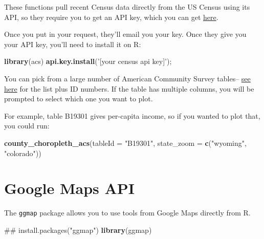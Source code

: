 \documentclass[]{book}
\makeatletter
\newenvironment{Shaded}{\begin{snugshade}}{\end{snugshade}}
\newcommand{\KeywordTok}[1]{\textcolor[rgb]{0.13,0.29,0.53}{\textbf{#1}}}
\newcommand{\DataTypeTok}[1]{\textcolor[rgb]{0.13,0.29,0.53}{#1}}
\newcommand{\StringTok}[1]{\textcolor[rgb]{0.31,0.60,0.02}{#1}}
\newcommand{\NormalTok}[1]{#1}
\newenvironment{kframe}{%
\medskip{}
\setlength{\fboxsep}{.8em}
 \def\at@end@of@kframe{}%
 \ifinner\ifhmode%
  \def\at@end@of@kframe{\end{minipage}}%
  \begin{minipage}{\columnwidth}%
 \fi\fi%
 \def\FrameCommand##1{\hskip\@totalleftmargin \hskip-\fboxsep
 \colorbox{shadecolor}{##1}\hskip-\fboxsep
     \hskip-\linewidth \hskip-\@totalleftmargin \hskip\columnwidth}%
 \MakeFramed {\advance\hsize-\width
   \@totalleftmargin\z@ \linewidth\hsize
   \@setminipage}}%
 {\par\unskip\endMakeFramed%
 \at@end@of@kframe}
\renewenvironment{Shaded}{\begin{kframe}}{\end{kframe}}
\theoremstyle{definition}
\theoremstyle{definition}
\theoremstyle{definition}
\theoremstyle{remark}
\makeatother
\begin{document}
These functions pull recent Census data directly from the US Census
using its API, so they require you to get an API key, which you can get
\href{http://api.census.gov/data/key_signup.html}{here}. \bigskip

Once you put in your request, they'll email you your key. Once they give
you your API key, you'll need to install it on R:

\begin{Shaded}
\begin{Highlighting}[]
\KeywordTok{library}\NormalTok{(acs)}
\KeywordTok{api.key.install}\NormalTok{(}\StringTok{'[your census api key]'}\NormalTok{);}
\end{Highlighting}
\end{Shaded}

You can pick from a large number of American Community Survey tables--
\href{http://factfinder.census.gov/faces/affhelp/jsf/pages/metadata.xhtml?lang=en\&type=dataset\&id=dataset.en.ACS_12_5YR}{see
here} for the list plus ID numbers. If the table has multiple columns,
you will be prompted to select which one you want to plot.

For example, table B19301 gives per-capita income, so if you wanted to
plot that, you could run:

\begin{Shaded}
\begin{Highlighting}[]
\KeywordTok{county_choropleth_acs}\NormalTok{(}\DataTypeTok{tableId =} \StringTok{"B19301"}\NormalTok{,}
                       \DataTypeTok{state_zoom =} \KeywordTok{c}\NormalTok{(}\StringTok{"wyoming"}\NormalTok{,}
                                      \StringTok{"colorado"}\NormalTok{))}
\end{Highlighting}
\end{Shaded}

\section{Google Maps API}\label{google-maps-api}

The \texttt{ggmap} package allows you to use tools from Google Maps
directly from R.

\begin{Shaded}
\begin{Highlighting}[]
\NormalTok{## install.packages("ggmap")}
\KeywordTok{library}\NormalTok{(ggmap)}
\end{Highlighting}
\end{Shaded}
\end{document}
